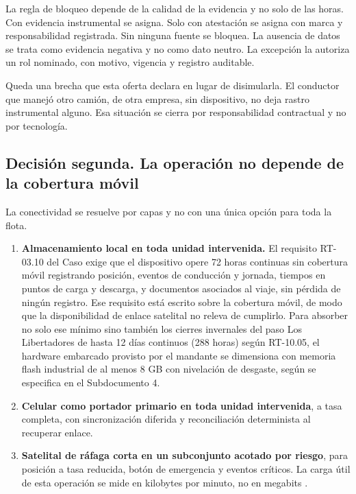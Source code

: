 La regla de bloqueo depende de la calidad de la evidencia y no solo de las horas. Con evidencia
instrumental se asigna. Solo con atestación se asigna con marca y responsabilidad registrada. Sin
ninguna fuente se bloquea. La ausencia de datos se trata como evidencia negativa y no como dato
neutro. La excepción la autoriza un rol nominado, con motivo, vigencia y registro auditable.

Queda una brecha que esta oferta declara en lugar de disimularla. El conductor que manejó otro
camión, de otra empresa, sin dispositivo, no deja rastro instrumental alguno. Esa situación se
cierra por responsabilidad contractual y no por tecnología.

\subsection{Decisión segunda. La operación no depende de la cobertura móvil}

La conectividad se resuelve por capas y no con una única opción para toda la flota.

\begin{enumerate}
    \item \textbf{Almacenamiento local en toda unidad intervenida.} El requisito RT-03.10 del Caso
    exige que el dispositivo opere 72 horas continuas sin cobertura móvil registrando posición,
    eventos de conducción y jornada, tiempos en puntos de carga y descarga, y documentos asociados
    al viaje, sin pérdida de ningún registro. Ese requisito está escrito sobre la cobertura móvil,
    de modo que la disponibilidad de enlace satelital no releva de cumplirlo. Para absorber no solo
    ese mínimo sino también los cierres invernales del paso Los Libertadores de hasta 12 días
    continuos (288 horas) según RT-10.05, el hardware embarcado provisto por el mandante se
    dimensiona con memoria flash industrial de al menos 8 GB con nivelación de desgaste, según se
    especifica en el Subdocumento 4.
    \item \textbf{Celular como portador primario en toda unidad intervenida}, a tasa completa, con
    sincronización diferida y reconciliación determinista al recuperar enlace.
    \item \textbf{Satelital de ráfaga corta en un subconjunto acotado por riesgo}, para posición a
    tasa reducida, botón de emergencia y eventos críticos. La carga útil de esta operación se mide
    en kilobytes por minuto, no en megabits \parencite{iridium_sbd}.
\end{enumerate}

